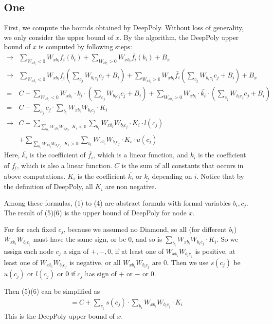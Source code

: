 \documentclass[]{article}
\theoremstyle{definition}
\begin{document}
\subsection*{One} First, we compute the bounds obtained by DeepPoly. Without loss of generality, we only consider the upper bound of $x$.   By the algorithm, the DeepPoly upper bound of $x$ is computed by following steps: \begin{align}
 \rightarrow&\sum_{W_{xb_i}<0}W_{xb_i}\underline{f_i}(b_i)+\sum_{W_{xb_i}>0}W_{xb_i}\bar{f_i}(b_i)+B_x\\
 \rightarrow&\sum_{W_{xb_i}<0}W_{xb_i}\underline{f_i}(\sum_{c_j}W_{b_ic_j}c_j+B_i)+\sum_{W_{xb_i}>0}W_{xb_i}\bar{f_i}(\sum_{c_j}W_{b_ic_j}c_j+B_i)+B_x\\
 =& C+\sum_{W_{xb_i}<0}W_{xb_i}\cdot\underline{k_i}\cdot(\sum_{c_j}W_{b_ic_j}c_j+B_i)+\sum_{W_{xb_i}>0}W_{xb_i}\cdot\bar{k_i}\cdot(\sum_{c_j}W_{b_ic_j}c_j+B_i)\\
 =& C+\sum_{c_j}c_j\cdot\sum_{b_i}W_{xb_i}W_{b_ic_j}\cdot K_i\\
 \rightarrow& C+\sum_{\sum_{b_i}W_{xb_i}W_{b_ic_j}\cdot K_i<0}\sum_{b_i}W_{xb_i}W_{b_ic_j}\cdot K_i\cdot l(c_j)\\
 &+\sum_{\sum_{b_i}W_{xb_i}W_{b_ic_j}\cdot K_i>0}\sum_{b_i}W_{xb_i}W_{b_ic_j}\cdot K_i\cdot u(c_j)
\end{align} Here, $\bar{k_i}$ is the coefficient of $\bar{f_i}$, which is a linear function, and $\underline{k_i}$ is the coefficient of $\underline{f_i}$, which is also a linear function. $C$ is the sum of all constants that occurs in above computations. $K_i$ is the coefficient $\bar{k_i}$ or $\underline{k_i}$ depending on $i$. Notice that by the definition of DeepPoly, all $K_i$ are non negative. 

Among these formulas, (1) to (4) are abstract formula with formal variables $b_i,c_j$. The result of (5)(6) is the upper bound of DeepPoly for node $x$. 

For for each fixed $c_j$, because we assumed no Diamond, so all (for different $b_i$) $W_{xb_i}W_{b_ic_j}$ must have the same sign, or be $0$, and so is $\sum_{b_i}W_{xb_i}W_{b_ic_j}\cdot K_i$. So we assign each node $c_j$ a sign of $+,-,0$,  if at least one of $W_{xb_i}W_{b_ic_j}$ is positive, at least one of $W_{xb_i}W_{b_ic_j}$ is negative, or all $W_{xb_i}W_{b_ic_j}$ are 0. Then we use $s(c_j)$ be $u(c_j)$ or $l(c_j)$ or $0$ if $c_j$ has sign of $+$ or $-$ or $0$.



Then (5)(6) can be simplified as \begin{align}
	=C+\sum_{c_j}s(c_j)\cdot\sum_{b_i}W_{xb_i}W_{b_ic_j}\cdot K_i
\end{align} This is the DeepPoly upper bound of $x$.
\end{document}
